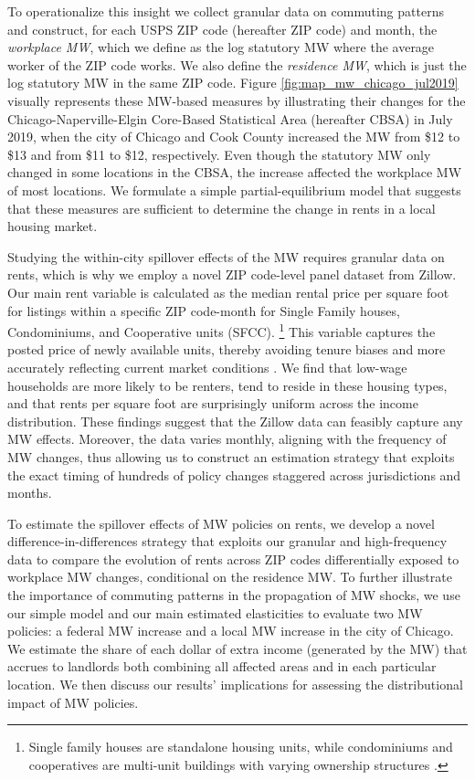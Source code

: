 To operationalize this insight we collect granular data on commuting patterns 
and construct, for each USPS ZIP code (hereafter ZIP code) and month,
the \textit{workplace MW}, which we define as the log statutory MW where
the average worker of the ZIP code works.
We also define the \textit{residence MW}, which is just the log statutory MW in 
the same ZIP code.
Figure \ref{fig:map_mw_chicago_jul2019} visually represents these MW-based 
measures by illustrating their changes for the Chicago-Naperville-Elgin 
Core-Based Statistical Area (hereafter CBSA) in July 2019,
when the city of Chicago and Cook County increased the MW from \$12 to \$13 and 
from \$11 to \$12, respectively.
Even though the statutory MW only changed in some locations in the CBSA, the 
increase affected the workplace MW of most locations.
We formulate a simple partial-equilibrium model that suggests that these 
measures are sufficient to determine the change in rents in a 
local housing market.

Studying the within-city spillover effects of the MW requires granular data on 
rents, which is why we employ a novel ZIP code-level panel dataset from Zillow.
Our main rent variable is calculated as the median rental price per square foot 
for listings within a specific ZIP code-month for Single Family houses, 
Condominiums, and Cooperative units (SFCC).%
\footnote{Single family houses are standalone housing units, while condominiums 
    and cooperatives are multi-unit buildings with varying ownership structures 
    \parencite{ZillowTypesOfHomes}.}
This variable captures the posted price of newly available units, 
thereby avoiding tenure biases and more accurately reflecting current market 
conditions \parencite{AmbroseEtAl2015}.
We find that low-wage households are more likely to be renters,
tend to reside in these housing types,
and that rents per square foot are surprisingly uniform across the income 
distribution.
These findings suggest that the Zillow data can feasibly capture any MW effects.
Moreover, the data varies monthly, aligning with the frequency of MW 
changes, thus allowing us to construct an estimation strategy that exploits the 
exact timing of hundreds of policy changes staggered across jurisdictions and 
months.

To estimate the spillover effects of MW policies on rents, we develop a novel 
difference-in-differences strategy that exploits our granular and high-frequency 
data to compare the evolution of rents across ZIP codes differentially exposed 
to workplace MW changes, conditional on the residence MW.
To further illustrate the importance of commuting patterns in the propagation 
of MW shocks, we use our simple model and our main estimated elasticities to 
evaluate two MW policies: 
a federal MW increase and
a local MW increase in the city of Chicago.
We estimate the share of each dollar of extra income (generated by the MW) that 
accrues to landlords both combining all affected areas and in each particular 
location.
We then discuss our results' implications for assessing the distributional 
impact of MW policies.

